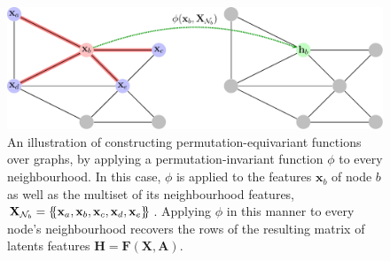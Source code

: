 \begin{figure}
    \centering
    \includegraphics[width=\linewidth]{figures/GC_GDL.pdf}
    \caption{An illustration of constructing permutation-equivariant functions over graphs, by applying a permutation-invariant function $\phi$ to every neighbourhood. In this case, $\phi$ is applied to the features $\mathbf{x}_b$ of node $b$ as well as the multiset  of its neighbourhood features, $\mathbf{X}_{\mathcal{N}_b} = \{\mskip-5mu\{\mathbf{x}_a, \mathbf{x}_b, \mathbf{x}_c, \mathbf{x}_d, \mathbf{x}_e\}\mskip-5mu\}$. Applying $\phi$ in this manner to every node's neighbourhood recovers the rows of the resulting matrix of latents features $\mathbf{H}=\mathbf{F}(\mathbf{X}, \mathbf{A})$.}
    \label{fig:gc_gdl}
\end{figure}%


%

